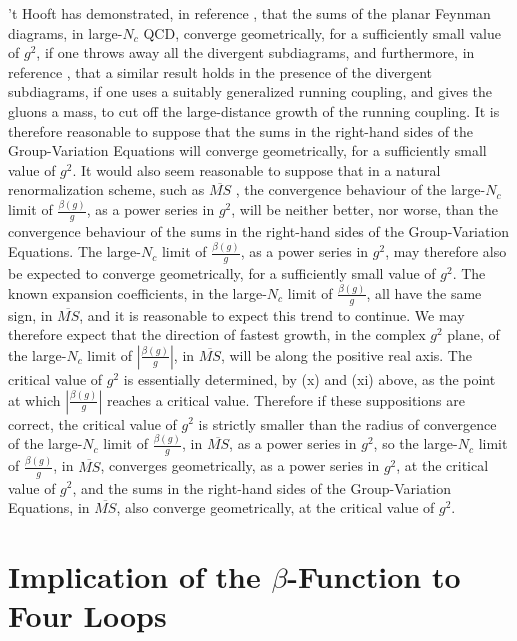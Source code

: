 \documentclass[a4paper,12pt,oneside]{article}
\begin{document}
't Hooft has demonstrated, in reference \cite{'t Hooft a}, that the sums 
of the planar Feynman diagrams, in
large-$N_c$ QCD, converge geometrically, for a sufficiently small value of
$g^2$, if one throws away all the divergent subdiagrams, and furthermore,
in reference \cite{'t Hooft b}, that a similar result holds in the 
presence of the divergent subdiagrams, if
one uses a suitably generalized running coupling, and gives the gluons a
mass, to cut off the large-distance growth of the running
coupling.  It is therefore reasonable to suppose that the sums in the
right-hand sides of the Group-Variation Equations will converge
geometrically, for a sufficiently small value of $g^2$.  It would also seem
reasonable to suppose that in a natural renormalization scheme, such as $\overline{MS}$ \cite{MS bar}, the convergence behaviour of the large-$N_c$ limit of $\frac{\beta(g)}{g}$, as
a power series in $g^2$, will be neither better, nor worse, than the
convergence behaviour of the sums in the right-hand sides of the
Group-Variation Equations.  The large-$N_c$ limit of $\frac{\beta(g)}{g}$, as a
power series in $g^2$, may therefore also be expected to converge
geometrically, for a sufficiently small value of $g^2$.  The known expansion
coefficients, in the large-$N_c$ limit of $\frac{\beta(g)}{g}$, all have the same
sign, in $\overline{MS}$, and it is reasonable to expect this trend to continue.  We
may therefore expect that the direction of fastest growth, in the complex
$g^2$ plane, of the large-$N_c$ limit of 
$\left|\frac{\beta(g)}{g}\right|$, in $\overline{MS}$, will be
along the positive real axis.  The critical value of $g^2$ is essentially
determined, by (x) and (xi) above, as the point at which 
$\left|\frac{\beta(g)}{g}\right|$
reaches a critical value.  Therefore if these suppositions are correct, 
the critical value of $g^2$ is 
strictly smaller than the radius of convergence of the large-$N_c$ limit 
of $\frac{\beta(g)}{g}$, in $\overline{MS}$, as a power series in $g^2$, 
so the large-$N_c$ limit of $\frac{\beta(g)}{g}$, in $\overline{MS}$, 
converges geometrically, as a power series in $g^2$, at the critical 
value of $g^2$, and the sums in the right-hand sides of the 
Group-Variation Equations, in $\overline{MS}$, also converge
geometrically, at the critical value of $g^2$.

\section{Implication of the $\beta$-Function to Four Loops}
\end{document}
